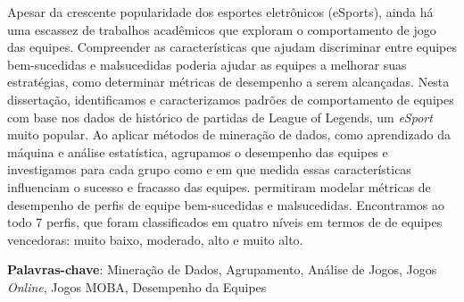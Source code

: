 Apesar da crescente popularidade dos esportes eletrônicos (eSports), ainda há uma escassez de trabalhos acadêmicos que exploram o comportamento de jogo das equipes. Compreender as características que ajudam discriminar entre equipes bem-sucedidas e malsucedidas poderia ajudar as equipes a melhorar suas estratégias, como determinar métricas de desempenho a serem alcançadas. Nesta dissertação, identificamos e caracterizamos padrões de comportamento de equipes com base nos dados de histórico de partidas de League of Legends, um \textit{eSport} muito popular. Ao aplicar métodos de mineração de dados, como aprendizado da máquina e análise estatística, agrupamos o desempenho das equipes e investigamos para cada grupo como e em que medida essas características influenciam o sucesso e fracasso das equipes.  permitiram modelar métricas de desempenho de perfis de equipe bem-sucedidas e malsucedidas. Encontramos ao todo 7  perfis, que foram classificados em quatro níveis em termos de  de equipes vencedoras: muito baixo, moderado, alto e muito alto.

\textbf{Palavras-chave}: Mineração de Dados, Agrupamento, Análise de Jogos, Jogos \textit{Online}, Jogos MOBA, Desempenho da Equipes